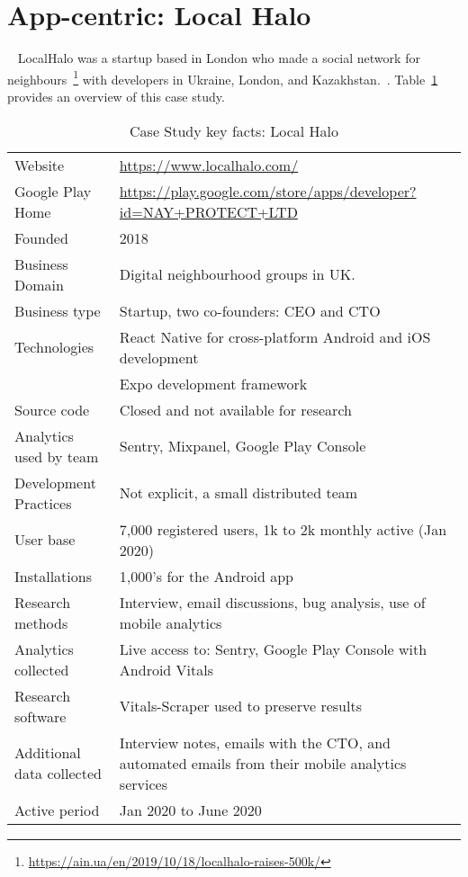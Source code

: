 \clearpage


\section{App-centric: Local Halo}~\label{case-study-overview-localhalo}
LocalHalo was a startup based in London who made a social network for neighbours~\footnote{\url{https://ain.ua/en/2019/10/18/localhalo-raises-500k/}} with developers in Ukraine, London, and Kazakhstan.~\citep{karpenko2019_localhalo_a_social_network_for_neighbors}. 
Table~\ref{tab:local_halo_anaytics_overview} provides an overview of this case study.

{\renewcommand{\arraystretch}{0.8}%
\begin{table}[htbp!]
    \centering
    \small
    \setlength{\tabcolsep}{1pt}
    \begin{tabular}{lp{11cm}}
       \toprule
       Website &\url{https://www.localhalo.com/} \\
       Google Play Home & \url{https://play.google.com/store/apps/developer?id=NAY+PROTECT+LTD} \\
       Founded &2018 \\
       Business Domain &Digital neighbourhood groups in UK.\\
       Business type &Startup, two co-founders: CEO and CTO \\
       Technologies  &React Native for cross-platform Android and iOS development \\
       &Expo development framework \\
       Source code  &Closed and not available for research \\
       Analytics used by team &Sentry, Mixpanel, Google Play Console \\
       Development Practices &Not explicit, a small distributed team \\
       \midrule
       User base &7,000 registered users, 1k to 2k monthly active (Jan 2020) \\
       Installations &1,000's for the Android app \\
       \midrule
       Research methods &Interview, email discussions, bug analysis, use of mobile analytics \\
       Analytics collected &Live access to: Sentry, Google Play Console with Android Vitals \\
       Research software &Vitals-Scraper used to preserve results \\
       Additional data collected &Interview notes, emails with the CTO, and automated emails from their mobile analytics services \\
       Active period &Jan 2020 to June 2020 \\
       \bottomrule
    \end{tabular}
    \caption{Case Study key facts: Local Halo}
    \label{tab:local_halo_anaytics_overview}
\end{table}
}

